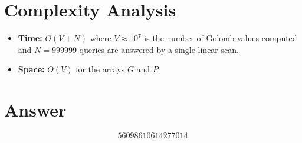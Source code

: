 \documentclass[a4paper,12pt]{article}
\begin{document}
\section{Complexity Analysis}
\begin{itemize}
    \item \textbf{Time:} $O(V + N)$ where $V \approx 10^7$ is the number of Golomb values computed and $N = 999999$ queries are answered by a single linear scan.
    \item \textbf{Space:} $O(V)$ for the arrays $G$ and $P$.
\end{itemize}

\section{Answer}

\[
\boxed{56098610614277014}
\]
\end{document}
